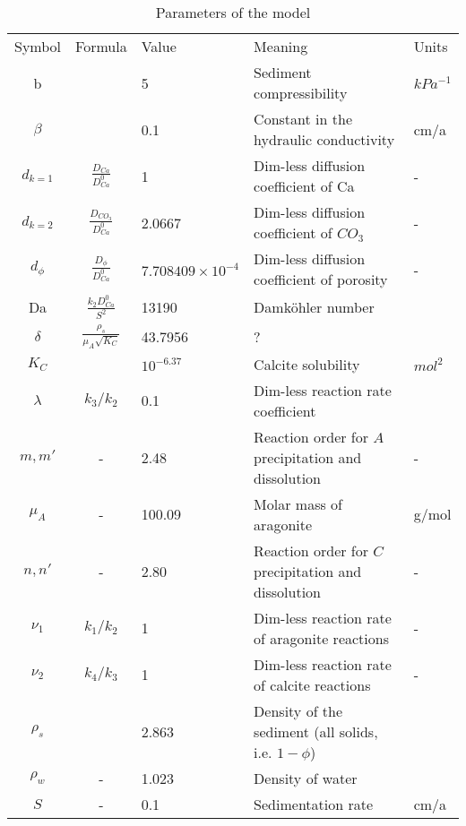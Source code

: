 \documentclass[10pt, letterpaper]{article}
\begin{document}
\begin{table}[hbt!]
    \centering
    \begin{tabular}{cclll}
 Symbol& Formula& Value&Meaning &Units\\
 b& & 5& Sediment compressibility&$kPa^{-1}$\\
 $\beta$& & 0.1& Constant in the hydraulic conductivity&cm/a\\
 $d_{k=1}$& $\frac{D_{Ca}}{D_{Ca}^0}$& 1& Dim-less diffusion coefficient of Ca&-\\
 $d_{k=2}$& $\frac{D_{CO_{3}}}{D_{Ca}^0}$& 2.0667& Dim-less diffusion coefficient of $CO_3$&-\\
 $d_\phi$& $\frac{D_\phi}{D_{Ca}^0}$& $7.708409\times10^{-4}$& Dim-less diffusion coefficient of porosity&-\\
         Da&  $\frac{k_2D_{Ca}^0}{S^2}$& 13190&Damköhler number &\\
 $\delta$& $\frac{\rho_s}{\mu_A\sqrt{K_C}}$& 43.7956& ?&\\
 $K_C$& & $10^{-6.37}$& Calcite solubility&$mol^2$\\
         $\lambda$&  $k_3/k_2$& 0.1& Dim-less reaction rate coefficient&\\
 $m, m'$& -& 2.48&Reaction order for $A$ precipitation and dissolution&-\\
 $\mu_A$& -& 100.09& Molar mass of aragonite&g/mol\\
 $n, n'$& -& 2.80&Reaction order for $C$ precipitation and dissolution&-\\
         $\nu_1$&  $k_1/k_2$& 1& Dim-less reaction rate of aragonite reactions&-\\
         $\nu_2$&  $k_4/k_3$& 1& Dim-less reaction rate of calcite reactions&-\\
         $\rho_s$&  & 2.863& Density of the sediment (all solids, i.e. $1 - \phi$)&\\
         $\rho_w$&  -& 1.023& Density of water&\\
 $S$& -& 0.1& Sedimentation rate&cm/a\\
    \end{tabular}
    \caption{Parameters of the model}
\end{table}
\end{document}
